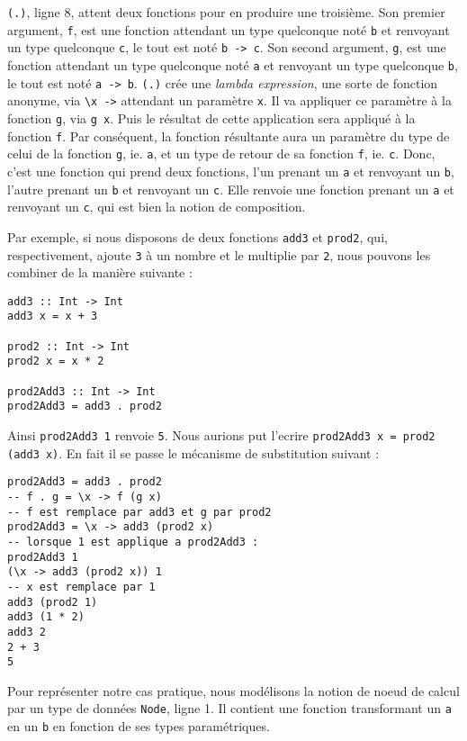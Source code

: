 \documentclass{llncs}
\begin{document}
\lstinline{(.)}, ligne 8, attent deux fonctions pour en produire une troisième.
Son premier argument, \lstinline{f}, est une fonction attendant un type quelconque
noté \lstinline{b} et renvoyant un type quelconque \lstinline{c}, le tout est
noté \lstinline{b -> c}.
Son second argument, \lstinline{g}, est une fonction attendant un type quelconque
noté \lstinline{a} et renvoyant un type quelconque \lstinline{b}, le tout est
noté \lstinline{a -> b}.
\lstinline{(.)} crée une \emph{lambda expression}, une sorte de fonction anonyme,
via \lstinline{\x ->} attendant un paramètre \lstinline{x}.
Il va appliquer ce paramètre à la fonction \lstinline{g}, via \lstinline{g x}.
Puis le résultat de cette application sera appliqué à la fonction \lstinline{f}.
Par conséquent, la fonction résultante aura un paramètre du type de celui de la
fonction \lstinline{g}, ie. \lstinline{a}, et un type de retour de sa fonction \lstinline{f},
ie. \lstinline{c}.
Donc, c'est une fonction qui prend deux fonctions, l'un prenant un \lstinline{a}
et renvoyant un \lstinline{b}, l'autre prenant un \lstinline{b} et renvoyant un \lstinline{c}.
Elle renvoie une fonction prenant un \lstinline{a} et renvoyant un \lstinline{c},
qui est bien la notion de composition.

Par exemple, si nous disposons de deux fonctions \lstinline{add3} et \lstinline{prod2},
qui, respectivement, ajoute \lstinline{3} à un nombre et le multiplie par \lstinline{2},
nous pouvons les combiner de la manière suivante :
\begin{lstlisting}
add3 :: Int -> Int
add3 x = x + 3

prod2 :: Int -> Int
prod2 x = x * 2

prod2Add3 :: Int -> Int
prod2Add3 = add3 . prod2
\end{lstlisting}

Ainsi \lstinline{prod2Add3 1} renvoie \lstinline{5}.
Nous aurions put l'ecrire \lstinline{prod2Add3 x = prod2 (add3 x)}.
En fait il se passe le mécanisme de substitution suivant :
\begin{lstlisting}
prod2Add3 = add3 . prod2
-- f . g = \x -> f (g x)
-- f est remplace par add3 et g par prod2
prod2Add3 = \x -> add3 (prod2 x)
-- lorsque 1 est applique a prod2Add3 :
prod2Add3 1
(\x -> add3 (prod2 x)) 1
-- x est remplace par 1
add3 (prod2 1)
add3 (1 * 2)
add3 2
2 + 3
5
\end{lstlisting}

Pour représenter notre cas pratique, nous modélisons la notion de noeud de calcul
par un type de données \lstinline{Node}, ligne 1.
Il contient une fonction transformant un \lstinline{a} en un \lstinline{b} en fonction
de ses types paramétriques.
\end{document}
